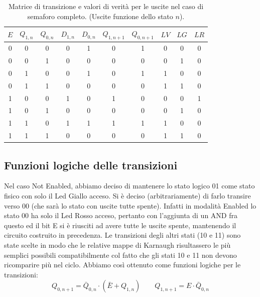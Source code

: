 \documentclass[10pt,a4paper]{article}
\begin{document}
\begin{table}
\centering
\begin{tabular}{|c||c|c|c|c||c|c||c|c|c|}
\hline
$E$ & $Q_{1,n}$ & $Q_{0, n}$ & $D_{1,n}$ & $D_{0,n}$ & $Q_{1, n+1}$ & $Q_{0, n+1}$ & $LV$ & $LG$ & $LR$\\
\hline
0 & 0 & 0 & 0 & 1 & 0 & 1 & 0 & 0 & 0 \\
0 & 0 & 1 & 0 & 0 & 0 & 0 & 0 & 1 & 0\\
0 & 1 & 0 & 0 & 1 & 0 & 1 & 1 & 0 & 0\\
0 & 1 & 1 & 0 & 0 & 0 & 0 & 1 & 1 & 0\\
\hline
1 & 0 & 0 & 1 & 0 & 1 & 0 & 0 & 0 & 1 \\
1 & 0 & 1 & 0 & 0 & 0 & 0 & 0 & 1 & 0\\
1 & 1 & 0 & 1 & 1 & 1 & 1 & 1 & 0 & 0\\
1 & 1 & 1 & 0 & 0 & 0 & 0 & 1 & 1 & 0\\
\hline
\end{tabular}
\caption{Matrice di transizione e valori di verità per le uscite nel caso di semaforo completo. (Uscite funzione dello stato $n$). \label{tab:semaforocompleto}}
\end{table} 


\subsection{Funzioni logiche delle transizioni}
Nel caso Not Enabled, abbiamo deciso di mantenere lo stato logico 01 come stato fisico con solo il Led Giallo acceso. Si è deciso (arbitrariamente) di farlo transire verso 00 (che sarà lo stato con uscite tutte spente). Infatti in modalità Enabled lo stato 00 ha solo il Led Rosso acceso, pertanto con l'aggiunta di un AND fra questo ed il bit E si è riusciti ad avere tutte le uscite spente, mantenendo il circuito costruito in precedenza. Le transizioni degli altri stati (10 e 11) sono state scelte in modo che le relative mappe di Karnaugh risultassero le più semplici possibili compatibilmente col fatto che gli stati 10 e 11 non devono ricomparire più nel ciclo.
Abbiamo così ottenuto come funzioni logiche per le transizioni:
\begin{equation}
Q_{0, n+1} = \bar{Q}_{0,n}\cdot(\bar{E}+Q_{1,n})\qquad
Q_{1, n+1} = E\cdot \bar{Q}_{0, n}
\end{equation}
\end{document}
